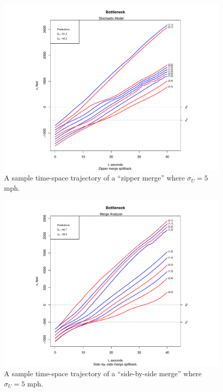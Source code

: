 \documentclass[Proceedings]{ascelike}
\begin{document}
\begin{figure}
\centering
\includegraphics[width = 5.5in]{Rplot09.pdf}
\caption{A sample time-space trajectory of a  ``zipper merge'' where  $\sigma_U = 5$ mph.}
\label{zip5}
\end{figure}

\begin{figure}
\centering
\includegraphics[width = 5.5in]{Rplot12.pdf}
\caption{A sample time-space trajectory of a  ``side-by-side merge'' where  $\sigma_U = 5$ mph.}
\label{sbs5}
\end{figure}
\end{document}
